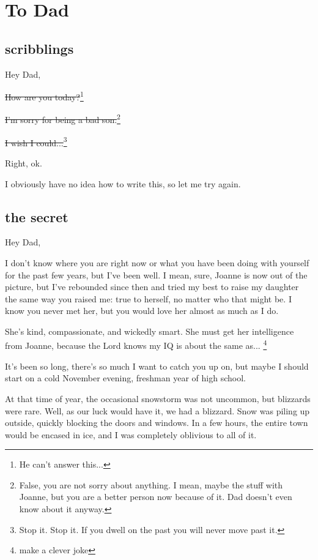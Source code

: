 \chapter{To Dad}

\section*{scribblings}

\noindent Hey Dad,

\sout{How are you today?}\footnote{He can't answer this...}

\sout{I'm sorry for being a bad son.}\footnote{False, you are not sorry about anything. I mean, maybe the stuff with Joanne, but you are a better person now because of it. Dad doesn't even know about it anyway.}

\sout{I wish I could...}\footnote{Stop it. Stop it. If you dwell on the past you will never move past it.}

Right, ok.

I obviously have no idea how to write this, so let me try again.

\newpage

\section*{the secret}

\noindent Hey Dad,

I don't know where you are right now or what you have been doing with yourself for the past few years, but I've been well.
I mean, sure, Joanne is now out of the picture, but I've rebounded since then and tried my best to raise my daughter the same way you raised me: true to herself, no matter who that might be.
I know you never met her, but you would love her almost as much as I do.

She's kind, compassionate, and wickedly smart.
She must get her intelligence from Joanne, because the Lord knows my IQ is about the same as... \footnote{make a clever joke} 

It's been so long, there's so much I want to catch you up on, but maybe I should start on a cold November evening, freshman year of high school.

At that time of year, the occasional snowstorm was not uncommon, but blizzards were rare.
Well, as our luck would have it, we had a blizzard.
Snow was piling up outside, quickly blocking the doors and windows.
In a few hours, the entire town would be encased in ice, and I was completely oblivious to all of it.

